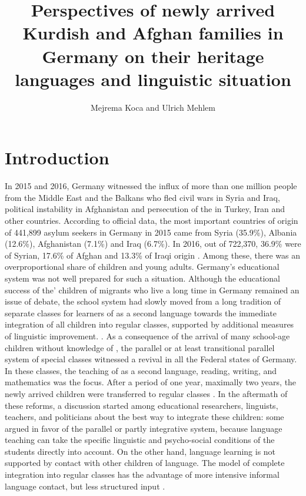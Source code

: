 \documentclass[output=paper,colorlinks,citecolor=brown]{langscibook}
\author{Mejrema Koca\orcid{}\affiliation{} and Ulrich Mehlem\orcid{}\affiliation{}}
\title[Perspectives of newly arrived Kurdish and Afghan families in Germany]{Perspectives of newly arrived Kurdish and Afghan families in Germany on their heritage languages and linguistic situation}
\begin{document}
\maketitle

\section{Introduction}\label{ch2.5.ss.1}

In 2015 and 2016, Germany witnessed the influx of more than one million people from the Middle East and the Balkans who fled civil wars in Syria and Iraq, political instability in Afghanistan and persecution of the  in Turkey, Iran and other countries. According to official data, the most important countries of origin of 441,899 asylum seekers in Germany in 2015 came from Syria (35.9\%), Albania (12.6\%), Afghanistan (7.1\%) and Iraq (6.7\%). In 2016, out of 722,370, 36.9\% were of Syrian, 17.6\% of Afghan and 13.3\% of Iraqi origin \citep{bamf2018}. Among these, there was an overproportional share of children and young adults. Germany's educational system was not well prepared for such a situation. Although the educational success of the' children of migrants who live a long time in Germany remained an issue of debate, the school system had slowly moved from a long tradition of separate classes for learners of  as a second language towards the immediate integration of all children into regular classes, supported by additional measures of linguistic improvement. \citep{brueggemann_nicolai2016}. As a consequence of the arrival of many school-age children without knowledge of , the parallel or at least transitional parallel system of special classes witnessed a revival in all the Federal states of Germany. In these classes, the teaching of  as a second language, reading, writing, and mathematics was the focus. After a period of one year, maximally two years, the newly arrived children were transferred to regular classes \citep{von_dewitz_massumi2017}. In the aftermath of these reforms, a discussion started among educational researchers, linguists, teachers, and politicians about the best way to integrate these children: some argued in favor of the parallel or partly integrative system, because language teaching can take the specific linguistic and psycho-social conditions of the students directly into account. On the other hand, language learning is not supported by contact with other children of  language. The model of complete integration into regular classes has the advantage of more intensive informal language contact, but less structured input \citep{karakayali_zur_nieden2018,roehner2017,roehner2020}.
\end{document}
